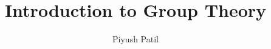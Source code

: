 \documentclass{article}
\begin{document}
\newcommand*{\tb}{\textbf}
\newcommand*{\ti}{\textit}
\newcommand*{\n}{\newline}
\newcommand*{\nn}{\newline \newline}
\newcommand*{\Pf}{\indent \ensuremath{\bullet} \textit{Proof}: }
\newcommand*{\In}{\indent \ensuremath{\bullet} \textit{Intuition}: }
\newcommand*{\Mo}{\indent \ensuremath{\bullet} \textit{Motivation}: }
\newcommand*{\Co}{\indent \ensuremath{\bullet} \textit{Corollary}: }
\newcommand*{\No}{\indent \ensuremath{\bullet} \textit{Notation}: }
\newcommand*{\N}{\mathbb{N}}
\newcommand*{\Z}{\mathbb{Z}}
\newcommand*{\Q}{\mathbb{Q}}
\newcommand*{\R}{\mathbb{R}}

\title{Introduction to Group Theory}
\author{Piyush Patil}
\maketitle
\end{document}
